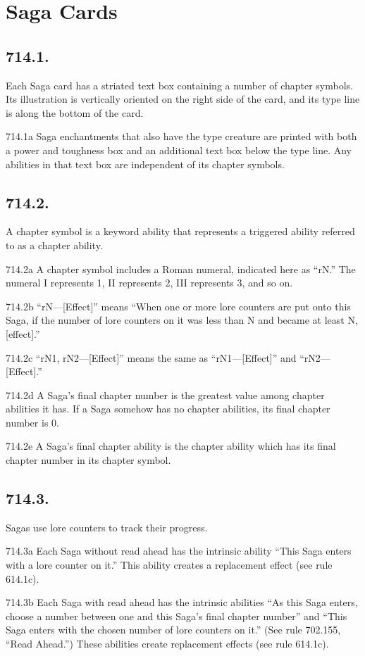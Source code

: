 \section{Saga Cards}
\subsection*{714.1.}
Each Saga card has a striated text box containing a number of chapter symbols. Its illustration is vertically oriented on the right side of the card, and its type line is along the bottom of the card.

714.1a Saga enchantments that also have the type creature are printed with both a power and toughness box and an additional text box below the type line. Any abilities in that text box are independent of its chapter symbols.

\subsection*{714.2.}
A chapter symbol is a keyword ability that represents a triggered ability referred to as a chapter ability.

714.2a A chapter symbol includes a Roman numeral, indicated here as “{rN}.” The numeral I represents 1, II represents 2, III represents 3, and so on.

714.2b “{rN}—[Effect]” means “When one or more lore counters are put onto this Saga, if the number of lore counters on it was less than N and became at least N, [effect].”

714.2c “{rN1}, {rN2}—[Effect]” means the same as “{rN1}—[Effect]” and “{rN2}—[Effect].”

714.2d A Saga’s final chapter number is the greatest value among chapter abilities it has. If a Saga somehow has no chapter abilities, its final chapter number is 0.

714.2e A Saga’s final chapter ability is the chapter ability which has its final chapter number in its chapter symbol.

\subsection*{714.3.}
Sagas use lore counters to track their progress.

714.3a Each Saga without read ahead has the intrinsic ability “This Saga enters with a lore counter on it.” This ability creates a replacement effect (see rule 614.1c).

714.3b Each Saga with read ahead has the intrinsic abilities “As this Saga enters, choose a number between one and this Saga’s final chapter number” and “This Saga enters with the chosen number of lore counters on it.” (See rule 702.155, “Read Ahead.”) These abilities create replacement effects (see rule 614.1c).

